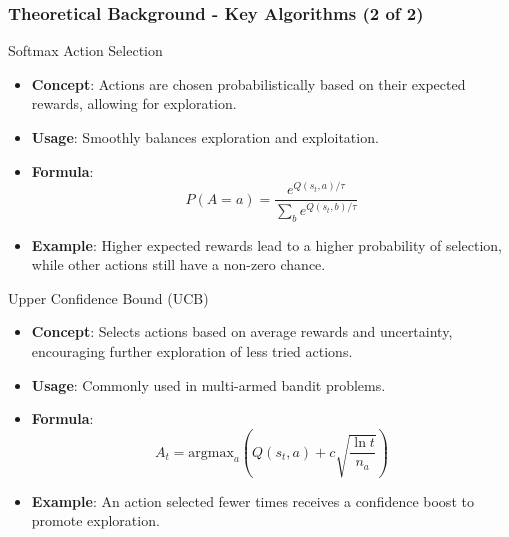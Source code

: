 \documentclass[aspectratio=169]{beamer}
\begin{document}
\begin{frame}[fragile]
    \frametitle{Theoretical Background - Key Algorithms (2 of 2)}
    \begin{block}{Softmax Action Selection}
        \begin{itemize}
            \item \textbf{Concept}: Actions are chosen probabilistically based on their expected rewards, allowing for exploration.
            \item \textbf{Usage}: Smoothly balances exploration and exploitation.
            \item \textbf{Formula}:
            \begin{equation}
            P(A = a) = \frac{e^{Q(s_t,a)/\tau}}{\sum_{b} e^{Q(s_t,b)/\tau}}
            \end{equation}
            \item \textbf{Example}: Higher expected rewards lead to a higher probability of selection, while other actions still have a non-zero chance.
        \end{itemize}
    \end{block}

    \begin{block}{Upper Confidence Bound (UCB)}
        \begin{itemize}
            \item \textbf{Concept}: Selects actions based on average rewards and uncertainty, encouraging further exploration of less tried actions.
            \item \textbf{Usage}: Commonly used in multi-armed bandit problems.
            \item \textbf{Formula}:
            \begin{equation}
            A_t = \text{argmax}_a \left( Q(s_t, a) + c \sqrt{\frac{\ln t}{n_a}} \right)
            \end{equation}
            \item \textbf{Example}: An action selected fewer times receives a confidence boost to promote exploration.
        \end{itemize}
    \end{block}
\end{frame}
\end{document}
